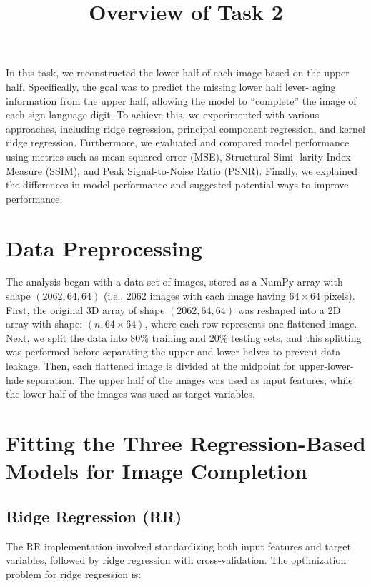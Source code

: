 \documentclass{article}
\begin{document}
    \title{Overview of Task 2}
    \maketitle
    In this task, we reconstructed the lower half of each image based on
    the upper half. Specifically, the goal was to predict the missing lower half lever-
    aging information from the upper half, allowing the model to “complete” the
    image of each sign language digit. To achieve this, we experimented with
    various approaches, including ridge regression, principal component regression,
    and kernel ridge regression. Furthermore, we evaluated and compared model
    performance using metrics such as mean squared error (MSE), Structural Simi-
    larity Index Measure (SSIM), and Peak Signal-to-Noise Ratio (PSNR). Finally,
    we explained the differences in model performance and suggested potential ways
    to improve performance.

    \section{Data Preprocessing}
    The analysis began with a data set of images, stored as a NumPy array with shape $(2062, 64, 64)$ (i.e., 2062 images with each image having $64 \times 64$ pixels). First, the original 3D array of shape $(2062, 64, 64)$ was reshaped into a 2D array with shape: $(n, 64 \times 64)$, where each row represents one flattened image. Next, we split the data into 80\% training and 20\% testing sets, and this splitting was performed before separating the upper and lower halves to prevent data leakage. Then, each flattened image is divided at the midpoint for upper-lower-hale separation. The upper half of the images was used as input features, while the lower half of the images was used as target variables.

    \section{Fitting the Three Regression-Based Models for Image Completion}
        \subsection{Ridge Regression (RR)}
        The RR implementation involved standardizing both input features and target variables, followed by ridge regression with cross-validation. The optimization problem for ridge regression is:
        
\end{document}
